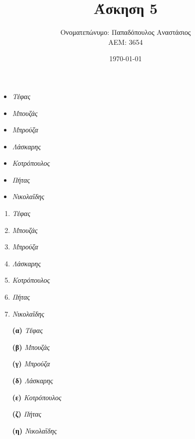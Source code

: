 \documentclass{article}
\title{Άσκηση 5}
\author{Ονοματεπώνυμο: Παπαδόπουλος Αναστάσιος \\ 
        ΑΕΜ: 3654}
\date{\today}
\begin{document}
    \maketitle
    \begin{itemize}
        \item \emph{Τέφας}
        \item \emph{Μπουζάς}
        \item \emph{Μπρούζα}
        \item \emph{Λάσκαρης}
        \item \emph{Κοτρόπουλος}
        \item \emph{Πήτας}
        \item \emph{Νικολαΐδης} 
    \end{itemize}
    \begin{enumerate}
        \item \emph{Τέφας}
        \item \emph{Μπουζάς}
        \item \emph{Μπρούζα}
        \item \emph{Λάσκαρης}
        \item \emph{Κοτρόπουλος}
        \item \emph{Πήτας}
        \item \emph{Νικολαΐδης}
    \end{enumerate}
    \begin{enumerate}
        \item [\textbf{(α)}] \emph{Τέφας}
        \item [\textbf{(β)}] \emph{Μπουζάς}
        \item [\textbf{(γ)}] \emph{Μπρούζα}
        \item [\textbf{(δ)}] \emph{Λάσκαρης}
        \item [\textbf{(ε)}] \emph{Κοτρόπουλος}
        \item [\textbf{(ζ)}] \emph{Πήτας}
        \item [\textbf{(η)}] \emph{Νικολαΐδης}
    \end{enumerate}
\end{document}
